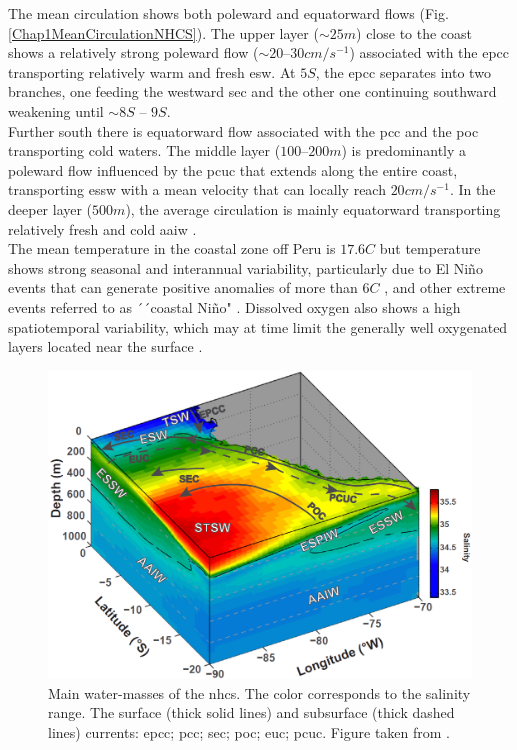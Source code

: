 The mean circulation shows both poleward and equatorward flows (Fig. \ref{Chap1MeanCirculationNHCS}). The upper layer ($\sim 25m$) close to the coast shows a relatively strong poleward flow ($\sim 20 – 30 cm/s^{-1}$) associated with the \acrshort{epcc} transporting relatively warm and fresh \acrshort{esw}. At $5$\textdegree $S$, the \acrshort{epcc} separates into two branches, one feeding the westward \acrshort{sec} and the other one continuing southward weakening until $\sim 8$\textdegree $S$ – $9$\textdegree $S$.\\

Further south there is equatorward flow associated with the \acrshort{pcc} and the \acrshort{poc} transporting cold waters. The middle layer ($100 – 200 m$) is predominantly a poleward flow influenced by the \acrshort{pcuc} that extends along the entire coast, transporting \acrshort{essw} with a mean velocity that can locally reach $20cm/s^{-1}$. In the deeper layer ($500m$), the average circulation is mainly equatorward transporting relatively fresh and cold \acrshort{aaiw}  \citep{ChaiDomi2013,PietTest2013}.\\

The mean temperature in the coastal zone off Peru is $17.6$\textdegree $C$ \citep{Mont2003} but temperature shows strong seasonal and interannual variability, particularly due to El Ni\~{n}o events that can generate positive anomalies of more than $6$\textdegree $C$  \citep{Sanc2000,Cai2014,Cai2017,Cai2018,Freu2019}, and other extreme events referred to as ´´coastal Ni\~{n}o" \citep{Eche2018,Garr2018,Hu2019,Rodr2019,TakaMart2019}. Dissolved oxygen also shows a high spatiotemporal variability, which may at time limit the generally well oxygenated layers located near the surface \citep{EspiEche2017,EspiEche2019}.\\

\begin{figure}[H]
	\includegraphics[width=1.0\textwidth]{figures/Chap1WaterMassesNHCS.png}
	\centering
	\caption{Main water-masses of the \acrshort{nhcs}. The color corresponds to the salinity range. The surface (thick solid lines) and subsurface (thick dashed lines) currents: \acrfull{epcc}; \acrfull{pcc}; \acrfull{sec}; \acrfull{poc}; \acrfull{euc}; \acrfull{pcuc}. Figure taken from \cite{GradChai2018}.}
	\label{Chap1WaterMassesNHCS}
\end{figure}

